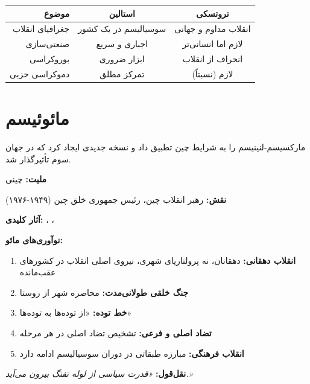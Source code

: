 \begin{comparebox}
\begin{table}[H]
\centering
\begin{tabular}{r|c|c}
\toprule
\textbf{موضوع} & \textbf{استالین} & \textbf{تروتسکی} \\
\midrule
جغرافیای انقلاب & سوسیالیسم در یک کشور & انقلاب مداوم و جهانی \\
صنعتی‌سازی & اجباری و سریع & لازم اما انسانی‌تر \\
بوروکراسی & ابزار ضروری & انحراف از انقلاب \\
دموکراسی حزبی & تمرکز مطلق & لازم (نسبتاً) \\
\bottomrule
\end{tabular}
\end{table}
\end{comparebox}

\section{مائوئیسم}

 مارکسیسم-لنینیسم را به شرایط چین تطبیق داد و نسخه جدیدی ایجاد کرد که در جهان سوم تأثیرگذار شد.

\begin{personbox}

\textbf{ملیت:} چینی

\textbf{نقش:} رهبر انقلاب چین، رئیس جمهوری خلق چین (۱۹۴۹-۱۹۷۶)

\textbf{آثار کلیدی:} ، ، 

\mediumspace

\textbf{نوآوری‌های مائو:}
\begin{enumerate}[nosep]
    \item \textbf{انقلاب دهقانی:} دهقانان، نه پرولتاریای شهری، نیروی اصلی انقلاب در کشورهای عقب‌مانده
    \item \textbf{جنگ خلقی طولانی‌مدت:} محاصره شهر از روستا
    \item \textbf{خط توده:} «از توده‌ها به توده‌ها»
    \item \textbf{تضاد اصلی و فرعی:} تشخیص تضاد اصلی در هر مرحله
    \item \textbf{انقلاب فرهنگی:} مبارزه طبقاتی در دوران سوسیالیسم ادامه دارد
\end{enumerate}

\mediumspace

\textbf{نقل‌قول:} \textit{«قدرت سیاسی از لوله تفنگ بیرون می‌آید.»}
\end{personbox}


